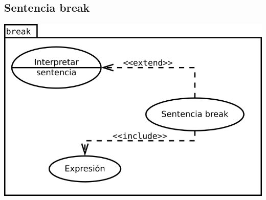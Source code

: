 \subsection {Sentencia break}
\begin{center}
\includegraphics[scale=0.4]{break.png} \\
\end{center}
